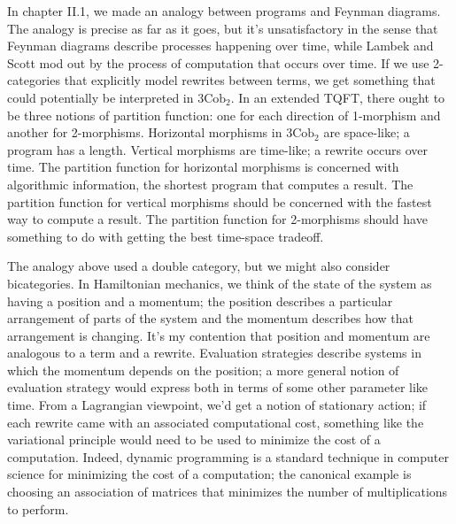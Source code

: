 \documentclass[12pt,twoside,openright]{report}
\newcommand{\Cob}{\mathrm{Cob}}
\begin{document}
In chapter II.1, we made an analogy between programs and Feynman diagrams.  The analogy is precise as far as it goes, but it's unsatisfactory in the sense that Feynman diagrams describe processes happening over time, while Lambek and Scott mod out by the process of computation that occurs over time.  If we use 2-categories that explicitly model rewrites between terms, we get something that could potentially be interpreted in $3\Cob_2$.  In an extended TQFT, there ought to be three notions of partition function: one for each direction of 1-morphism and another for 2-morphisms.  Horizontal morphisms in $3\Cob_2$ are space-like; a program has a length.  Vertical morphisms are time-like; a rewrite occurs over time.  The partition function for horizontal morphisms is concerned with algorithmic information, the shortest program that computes a result.  The partition function for vertical
morphisms should be concerned with the fastest way to compute a result.  The partition function for 2-morphisms should have something to do with getting the best time-space tradeoff.

The analogy above used a double category, but we might also consider bicategories.  In Hamiltonian mechanics, we think of the state of the system as having a position and a momentum; the position describes a particular arrangement of parts of the system and the momentum describes how that arrangement is changing.  It's my contention that position and momentum are analogous to a term and a rewrite.  Evaluation strategies describe systems in which the momentum depends on the position; a more general notion of evaluation strategy would express both in terms of some other parameter like time.  From a Lagrangian viewpoint, we'd get a notion of stationary action; if each rewrite came with an associated computational cost, something like the variational principle would need to be used to minimize the cost of a computation.  Indeed, dynamic programming is a standard technique in computer science for minimizing the cost of a computation; the canonical example is choosing an association of matrices that minimizes the number of multiplications to perform.
\end{document}
